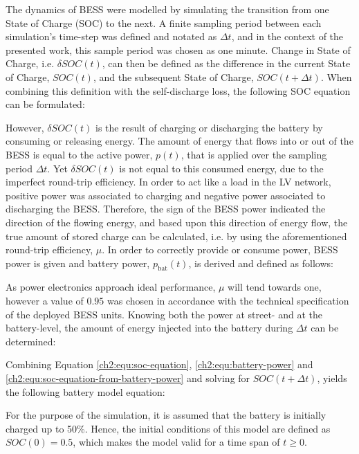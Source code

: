 The dynamics of BESS were modelled by simulating the transition from one State of Charge (SOC) to the next.
A finite sampling period between each simulation's time-step was defined and notated as $\Delta t$, and in the context of the presented work, this sample period was chosen as one minute.
Change in State of Charge, i.e. $\delta SOC(t)$, can then be defined as the difference in the current State of Charge, $SOC(t)$, and the subsequent State of Charge, $SOC(t+\Delta t)$.
When combining this definition with the self-discharge loss, the following SOC equation can be formulated:



However, $\delta SOC(t)$ is the result of charging or discharging the battery by consuming or releasing energy.
The amount of energy that flows into or out of the BESS is equal to the active power, $p(t)$, that is applied over the sampling period $\Delta t$.
Yet $\delta SOC(t)$ is not equal to this consumed energy, due to the imperfect round-trip efficiency.
In order to act like a load in the LV network, positive power was associated to charging and negative power associated to discharging the BESS.
Therefore, the sign of the BESS power indicated the direction of the flowing energy, and based upon this direction of energy flow, the true amount of stored charge can be calculated, i.e. by using the aforementioned round-trip efficiency, $\mu$.
In order to correctly provide or consume power, BESS power is given and battery power, $p_\text{bat}(t)$, is derived and defined as follows:



As power electronics approach ideal performance, $\mu$ will tend towards one, however a value of $0.95$ was chosen in accordance with the technical specification of the deployed BESS units.
Knowing both the power at street- and at the battery-level, the amount of energy injected into the battery during $\Delta t$ can be determined:



Combining Equation \ref{ch2:equ:soc-equation}, \ref{ch2:equ:battery-power} and \ref{ch2:equ:soc-equation-from-battery-power} and solving for $SOC(t+\Delta t)$, yields the following battery model equation:



For the purpose of the simulation, it is assumed that the battery is initially charged up to 50\%.
Hence, the initial conditions of this model are defined as $SOC(0) = 0.5$, which makes the model valid for a time span of $t \geq 0$.


